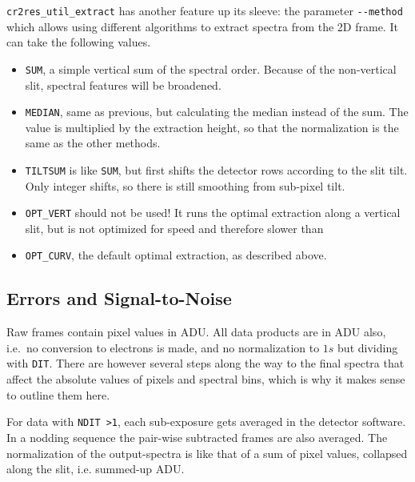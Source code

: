 \verb!cr2res_util_extract! has another feature up its sleeve: the parameter
\verb!--method! which allows using different algorithms to extract spectra from
the 2D frame. It can take the following values.
\begin{itemize}
    \item \verb!SUM!, a simple vertical sum of the spectral order. Because of
    the non-vertical slit, spectral features will be broadened.
    \item \verb!MEDIAN!, same as previous, but calculating the median instead of
    the sum. The value is multiplied by the extraction height, so that the
    normalization is the same as the other methods.
    \item \verb!TILTSUM! is like \verb!SUM!, but first shifts the detector rows
    according to the slit tilt. Only integer shifts, so there is still smoothing
    from sub-pixel tilt.
    \item \verb!OPT_VERT! should not be used! It runs the optimal extraction
    along a vertical slit, but is not optimized for speed and therefore slower
    than
    \item \verb!OPT_CURV!, the default optimal extraction, as described above.
\end{itemize}

\subsection{Errors and Signal-to-Noise}
\label{sec:errors}

Raw frames contain pixel values in ADU. All data products are in ADU also,
i.e.~no conversion to electrons is made, and no normalization to $1s$ but
dividing with \verb!DIT!. There are however several steps along the way to the
final spectra that affect the absolute values of pixels and spectral bins, which
is why it makes sense to outline them here.

For data with \verb!NDIT >1!, each sub-exposure gets averaged in the
detector software. In a nodding sequence the pair-wise subtracted frames are
also averaged. The normalization of the output-spectra is like that
of a sum of pixel values, collapsed along the slit, i.e. summed-up ADU.


